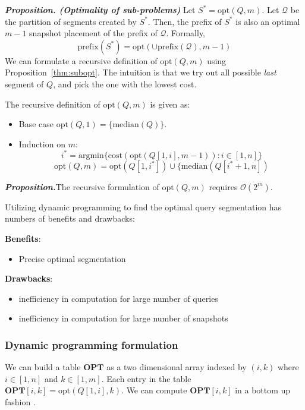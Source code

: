 \textbf{\emph{Proposition. (Optimality of sub-problems)}}
Let $S^* = \mathrm{opt}(Q, m)$.  Let $\mathcal{Q}$ be the partition of segments created by $S^*$.  Then, the prefix of $S^*$ is also an optimal $m-1$ snapshot placement of the prefix of $\mathcal{Q}$. Formally, $$\mathrm{prefix}(S^*) = \mathrm{opt}(\cup\mathrm{prefix}(\mathcal{Q}), m-1)$$
We can formulate a recursive definition of $\mathrm{opt}(Q, m)$ using
Proposition~\ref{thm:subopt}.  The intuition is that we try out all possible
{\em last} segment of $Q$, and pick the one with the lowest cost.

The recursive definition of $\mathrm{opt}(Q, m)$ is given as:

\begin{itemize}
	\item Base case $ \mathrm{opt}(Q, 1) = \{\mathrm{median}(Q)\}$.
	\item Induction on $m$:
	$$i^* = \mathrm{argmin}\{\mathrm{cost}(\mathrm{opt}(Q[1,i], m-1)): i\in[1,
	n]\}$$
	$$
	\mathrm{opt}(Q, m) = \mathrm{opt}(Q[1, i^*]) \cup \{\mathrm{median}(Q[i^*+1, n])
	$$
\end{itemize}
\textbf{\emph{Proposition.}}The recursive formulation of $\mathrm{opt}(Q, m)$ requires $\mathcal{O}(2^{m})$.

Utilizing dynamic programming to find the optimal query segmentation has numbers of benefits and drawbacks:

\textbf{Benefits}:
\begin{itemize}
	\item Precise optimal segmentation  
\end{itemize}
\textbf{Drawbacks}:
\begin{itemize}
	\item inefficiency in computation for large number of queries
	\item inefficiency in computation for large number of snapshots
\end{itemize}
\subsubsection{Dynamic programming formulation}
\label{sec:dynamic}

We can build a table $\mathbf{OPT}$ as a two dimensional array
indexed by $(i, k)$ where $i\in [1, n]$ and $k\in [1, m]$.  Each entry
in the table $\mathbf{OPT}[i,k] = \mathrm{opt}(Q[1,i], k)$.
We can compute $\mathbf{OPT}[i,k]$ in a bottom up fashion \cite{}.

